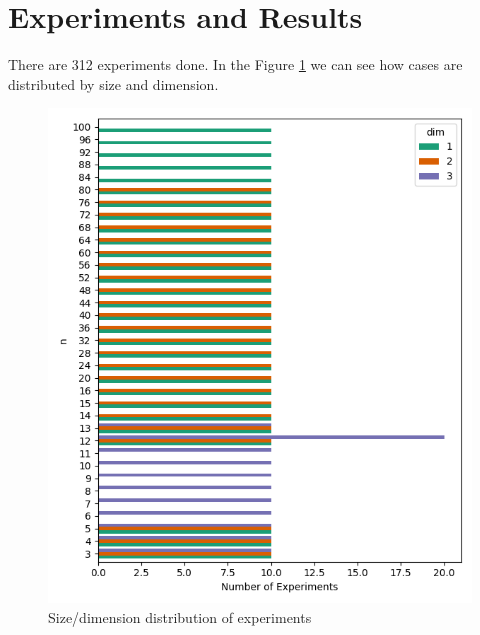 \documentclass{article}
\begin{document}
\section{Experiments and Results}
\par There are 312 experiments done. In the Figure \ref{fig:cases_distribution} we can see how cases are distributed by size and dimension.
\begin{figure}[ht]
  \centering
  \includegraphics[width=\textwidth]{pics/torus scores/cases.png}
  \caption{Size/dimension distribution of experiments}
  \label{fig:cases_distribution}
\end{figure}
\end{document}
